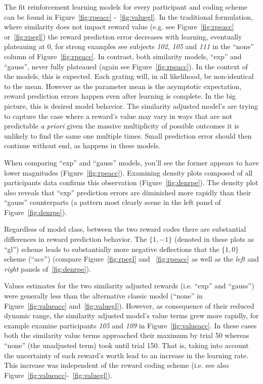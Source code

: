 \documentclass[doc,12pt]{apa}        %
\begin{document}
The fit reinforcement learning models for every participant and coding scheme can be found in Figure~\ref{fig:rpeacc} -~\ref{fig:valuegl}.  In the traditional formulation, where similarity does not impact reward value (e.g. see Figure~\ref{fig:rpeacc} or~\ref{fig:rpegl}) the reward prediction error decreases with learning, eventually plateauing at 0, for strong examples see subjects \emph{102}, \emph{105} and \emph{111} in the ``none'' column of Figure~\ref{fig:rpeacc}.  In contrast, both similarity models, ``exp'' and ``gauss'', never fully plateaued (again see Figure~\ref{fig:rpeacc}).  In the context of the models, this is expected.  Each grating will, in all likelihood, be non-identical to the mean. However as the parameter mean is the asymptotic expectation, reward prediction errors happen even after learning is complete.  In the big picture, this is desired model behavior.  The similarity adjusted model's are trying to capture the case where a reward's value may vary in ways that are not predictable \emph{a priori} given the massive multiplicity of possible outcomes it is unlikely to find the same one multiple times.  Small prediction error should then continue without end, as happens in these models.

When comparing ``exp'' and ``gauss'' models, you'll see the former appears to have lower magnitudes (Figure~\ref{fig:rpeacc}).  Examining density plots composed of all participants data confirms this observation (Figure~\ref{fig:denrpe}).  The density plot also reveals that ``exp'' prediction errors are diminished more rapidly than their ``gauss'' counterparts (a pattern most clearly scene in the left panel of Figure~\ref{fig:denrpe}).  

Regardless of model class, between the two reward codes there are substantial differences in reward prediction behavior.  The $\{1,-1\}$ (denoted in these plots as ``gl'') scheme leads to substantially more negative deflections that the $\{1,0\}$ scheme (``acc'') (compare Figure~\ref{fig:rpegl} and ~\ref{fig:rpeacc} as well as the \emph{left} and \emph{right} panels of~\ref{fig:denrpe}).   

Values estimates for the two similarity adjusted rewards (i.e. ``exp'' and ``gauss'') were generally less than the alternative classic model (``none'' in Figure~\ref{fig:valueacc} and~\ref{fig:valuegl}).  However, as consequence of their reduced dynamic range, the similarity adjusted model's value terms grew more rapidly, for example examine participants \emph{105} and \emph{109} in Figure~\ref{fig:valueacc}.  In these cases both the similarity value terms approached their maximum by trial 50 whereas ``none'' (the unadjusted term) took until trial 150.  That is, taking into account the uncertainty of each reward's worth lead to an increase in the learning rate.  This increase was independent of the reward coding scheme (i.e. see also Figure~\ref{fig:valueacc}-~\ref{fig:valuegl}).  
\end{document}
